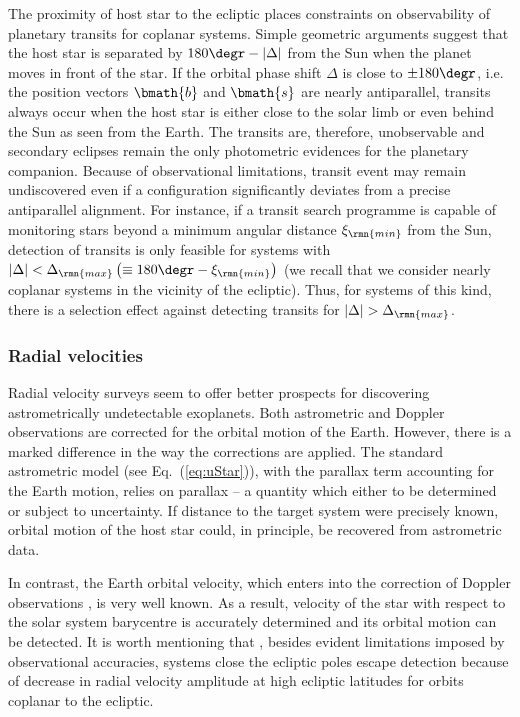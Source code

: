 \documentclass[fleqn,usenatbib,useAMS,usedcolumn]{mnras}
\begin{document}
The proximity of host star to the ecliptic places constraints on observability of planetary transits for coplanar systems. Simple geometric arguments suggest that the host star is separated by $180\degr-\left|\Delta\right|$ from the Sun when the planet moves in front of the star. If the orbital phase shift $\Delta$ is close to $\pm180\degr$, i.e. the position vectors $\bmath{b}$ and $\bmath{s}$ are nearly antiparallel, transits always occur when the host star is either close to the solar limb or even behind the Sun as seen from the Earth. The transits are, therefore, unobservable and secondary eclipses remain the only photometric evidences for the planetary companion. Because of observational limitations, transit event may remain undiscovered even if a configuration significantly deviates from a precise antiparallel alignment. For instance, if a transit search programme is capable of monitoring stars beyond a minimum angular distance $\xi_\rmn{min}$ from the Sun, detection of transits is only feasible for systems with $\left|\Delta\right|<\Delta_\rmn{max}\left(\equiv180\degr-\xi_\rmn{min}\right)$ (we recall that we consider nearly coplanar systems in the vicinity of the ecliptic). Thus, for systems of this kind, there is a selection effect against detecting transits for $\left|\Delta\right|>\Delta_\rmn{max}$.

\subsubsection{Radial velocities}

Radial velocity surveys seem to offer better prospects for discovering astrometrically undetectable exoplanets.
Both astrometric and Doppler observations are corrected for the orbital motion of the Earth.
However, there is a marked difference in the way the corrections are applied.
The standard astrometric model (see Eq.~(\ref{eq:uStar})), with the parallax term accounting for the Earth motion, relies on parallax -- a quantity which either to be determined or subject to uncertainty. If distance to the target system were precisely known, orbital motion of the host star could, in principle, be recovered from astrometric data.

In contrast, the Earth orbital velocity, which enters into the correction of Doppler observations \citep{Wright+Eastman2014}, is very well known. As a result, velocity of the star with respect to the solar system barycentre is accurately determined and its orbital motion can be detected. It is worth mentioning that ,  besides evident limitations imposed by observational accuracies, systems close the ecliptic poles escape detection because of decrease in radial velocity amplitude at high ecliptic latitudes for orbits coplanar to the ecliptic.
\end{document}

